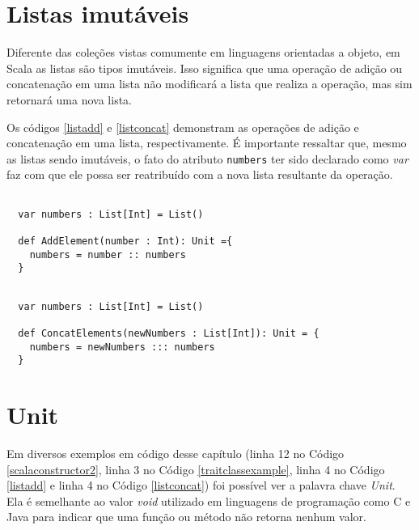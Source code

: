 \section{Listas imutáveis}

Diferente das coleções vistas comumente em linguagens 
orientadas a objeto, em Scala as listas são tipos 
imutáveis. Isso significa que uma operação de adição 
ou concatenação em uma lista não modificará a lista 
que realiza a operação, mas sim retornará uma nova 
lista\cite{ordesky2008}. 

Os códigos \ref{listadd} e \ref{listconcat} demonstram 
as operações de adição e concatenação em uma lista, 
respectivamente. É importante ressaltar que, mesmo 
as listas sendo imutáveis, o fato do 
atributo \texttt{numbers} ter sido declarado como \textit{var} 
faz com que ele possa ser reatribuído com a nova lista 
resultante da operação.

\begin{lstlisting}[caption={Exemplo de adição em uma lista imutável},label=listadd]

  var numbers : List[Int] = List()
  
  def AddElement(number : Int): Unit ={
    numbers = number :: numbers
  }

\end{lstlisting}

\begin{lstlisting}[caption={Exemplo de concatenação em uma lista imutável},label=listconcat]

  var numbers : List[Int] = List()
  
  def ConcatElements(newNumbers : List[Int]): Unit = {
    numbers = newNumbers ::: numbers
  }    

\end{lstlisting}

\section{Unit}

Em diversos exemplos em código desse capítulo 
(linha 12 no Código \ref{scalaconstructor2}, linha 3 no Código 
\ref{traitclassexample}, linha 4 no Código 
\ref{listadd} e linha 4 no Código \ref{listconcat}) 
foi possível ver a palavra chave \textit{Unit}. Ela é semelhante ao 
valor \textit{void} utilizado em linguagens de programação como C e 
Java para indicar que uma função ou método não retorna 
nenhum valor\cite{wampler2021}.
